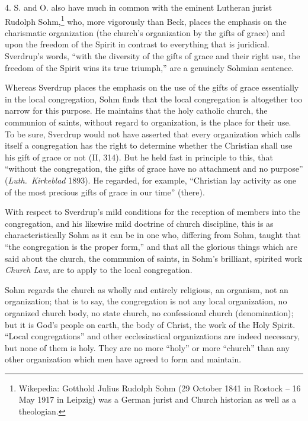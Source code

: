 4. S. and O. also have much in common with the eminent Lutheran jurist Rudolph Sohm,\footnote{Wikepedia: Gotthold Julius Rudolph Sohm (29 October 1841 in Rostock – 16 May 1917 in Leipzig) was a German jurist and Church historian as well as a theologian.} who, more vigorously than Beck, places the emphasis on the charismatic organization (the church's organization by the gifts of grace) and upon the freedom of the Spirit in contrast to everything that is juridical. Sverdrup's words, ``with the diversity of the gifts of grace and their right use, the freedom of the Spirit wins its true triumph,'' are a genuinely Sohmian sentence.

Whereas Sverdrup places the emphasis on the use of the gifts of grace essentially in the local congregation, Sohm finds that the local congregation is altogether too narrow for this purpose. He maintains that the holy catholic church, the communion of saints, without regard to organization, is the place for their use. To be sure, Sverdrup would not have asserted that every organization which calls itself a congregation has the right to determine whether the Christian shall use his gift of grace or not (II, 314). But he held fast in principle to this, that ``without the congregation, the gifts of grace have no attachment and no purpose'' (\textit{Luth.\ Kirkeblad} 1893). He regarded, for example, ``Christian lay activity as one of the most precious gifts of grace in our time'' (there).

With respect to Sverdrup's mild conditions for the reception of members into the congregation, and his likewise mild doctrine of church discipline, this is as characteristically Sohm as it can be in one who, differing from Sohm, taught that ``the congregation is the proper form,'' and that all the glorious things which are said about the church, the communion of saints, in Sohm's brilliant, spirited work \textit{Church Law}, are to apply to the local congregation.

Sohm regards the church as wholly and entirely religious, an organism, not an organization; that is to say, the congregation is not any local organization, no organized church body, no state church, no confessional church (denomination); but it is God's people on earth, the body of Christ, the work of the Holy Spirit. ``Local congregations'' and other ecclesiastical organizations are indeed necessary, but none of them is holy. They are no more ``holy'' or more ``church'' than any other organization which men have agreed to form and maintain.

